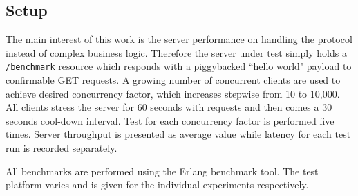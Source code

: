 



\subsection{Setup}

The main interest of this work is the server performance on handling the protocol instead of complex business logic. Therefore the server under test simply holds a \verb|/benchmark| resource which responds with a piggybacked ``hello world" payload to confirmable GET requests. A growing number of concurrent clients are used to achieve desired concurrency factor, which increases stepwise from 10 to 10,000. All clients stress the server for 60 seconds with requests and then comes a 30 seconds cool-down interval.  Test for each concurrency factor is performed five times. Server throughput is presented as average value while latency for each test run is recorded separately.

All benchmarks are performed using the Erlang benchmark tool. The test platform varies and is given for the individual experiments respectively.

